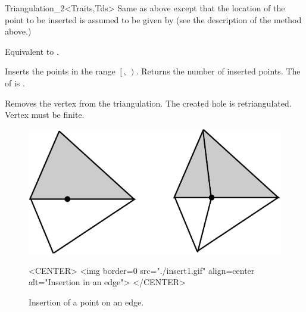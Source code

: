 \begin{ccRefClass}{Triangulation_2<Traits,Tds>}
{Same as above except that the location of the point
  to be inserted is assumed to be given by
 (see the description of the  method above.)}

{Equivalent to .}

{Inserts the points in the range
 $\left[\right.$, $\left.\right)$.
 Returns the number of inserted points.
 \ccPrecond The  of 
 is .}

{Removes the vertex from the triangulation. The created hole is 
 retriangulated.
 \ccPrecond Vertex  must be finite.}


\begin{figure}
\begin{ccTexOnly}
\begin{center}
\includegraphics{Triangulation_2/insert1}
\end{center}
\end{ccTexOnly}
\caption{Insertion of a point on an edge.
\label{Triangulation_ref_Fig_inser1t}}

\begin{ccHtmlOnly}
<CENTER>
<img border=0 src="./insert1.gif" align=center alt="Insertion in an edge">
</CENTER>
\end{ccHtmlOnly}
\end{figure}





\end{ccRefClass}
